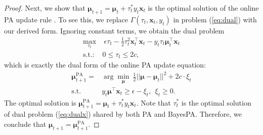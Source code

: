 \documentclass[twoside,11pt]{article}
\newcommand{\xv}{\bm{x}}
\newcommand{\muv}{\bm \mu}
\begin{document}
\begin{proof}
Next, we show that $\muv_{t+1} = \muv_{t}+\tau_t^* y_t \xv_t$ is the optimal solution of the online PA update rule \citep{crammer2006pa}. To see this, we replace $\Gamma(\tau_t, \xv_t, y_t)$ in problem (\ref{eq:dual}) with our derived form. Ignoring constant terms, we obtain the dual problem
\begin{equation}
\begin{array}{rl}
\label{eq:dualx}
\max\limits_{\tau_t}& {~\epsilon \tau_t-\frac{1}{2}\tau_t^2 \xv_t^\top \xv_t- y_t \tau_t \muv_t^\top \xv_t} \\
\text{s.t.: }&  0 \leq \tau_t \leq 2 c ,
\end{array}
\end{equation}
which is exactly the dual form of the online PA update equation:
\begin{equation*}
\begin{array}{rl}
\muv_{t+1}^{\text{PA}} = & \arg\min\limits_{\muv}{~ \frac{1}{2} ||\muv-\muv_{t}||^2+2 c \cdot \xi_t } \\
\text{s.t.   }  & y_t \muv^\top \xv_t \geq \epsilon-\xi_t, ~~ \xi_t \geq 0.
\end{array}
\end{equation*}
The optimal solution is $\muv_{t+1}^{\text{PA}} = \muv_{t}+\tau_t^* y_t \xv_t$. Note that $\tau_t^*$ is the optimal solution of dual problem (\ref{eq:dualx}) shared by both PA and BayesPA. Therefore, we conclude that  $\muv_{t+1} = \muv_{t+1}^{\text{PA}}$.
\end{proof}



%
\end{document}

